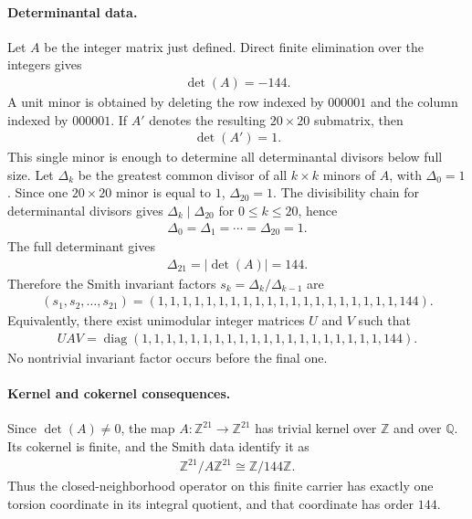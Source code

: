 \paragraph{Determinantal data.} Let $A$ be the integer matrix just defined. Direct finite elimination over the integers gives
$$\begin{aligned}
\det(A)=-144.
\end{aligned}$$
A unit minor is obtained by deleting the row indexed by $000001$ and the column indexed by $000001$. If $A'$ denotes the resulting $20\times 20$ submatrix, then
$$\begin{aligned}
\det(A')=1.
\end{aligned}$$
This single minor is enough to determine all determinantal divisors below full size. Let $\Delta_k$ be the greatest common divisor of all $k\times k$ minors of $A$, with $\Delta_0=1$. Since one $20\times 20$ minor is equal to $1$, $\Delta_{20}=1$. The divisibility chain for determinantal divisors gives $\Delta_k\mid \Delta_{20}$ for $0\le k\le 20$, hence
$$\begin{aligned}
\Delta_0=\Delta_1=\cdots=\Delta_{20}=1.
\end{aligned}$$
The full determinant gives
$$\begin{aligned}
\Delta_{21}=|\det(A)|=144.
\end{aligned}$$
Therefore the Smith invariant factors $s_k=\Delta_k/\Delta_{k-1}$ are
$$\begin{aligned}
(s_1,s_2,\ldots,s_{21})=(1,1,1,1,1,1,1,1,1,1,1,1,1,1,1,1,1,1,1,1,144).
\end{aligned}$$
Equivalently, there exist unimodular integer matrices $U$ and $V$ such that
$$\begin{aligned}
UAV=\operatorname{diag}(1,1,1,1,1,1,1,1,1,1,1,1,1,1,1,1,1,1,1,1,144).
\end{aligned}$$
No nontrivial invariant factor occurs before the final one.

\paragraph{Kernel and cokernel consequences.} Since $\det(A)\ne 0$, the map $A:\mathbb{Z}^{21}\to\mathbb{Z}^{21}$ has trivial kernel over $\mathbb{Z}$ and over $\mathbb{Q}$. Its cokernel is finite, and the Smith data identify it as
$$\begin{aligned}
\mathbb{Z}^{21}/A\mathbb{Z}^{21}\cong \mathbb{Z}/144\mathbb{Z}.
\end{aligned}$$
Thus the closed-neighborhood operator on this finite carrier has exactly one torsion coordinate in its integral quotient, and that coordinate has order $144$.

